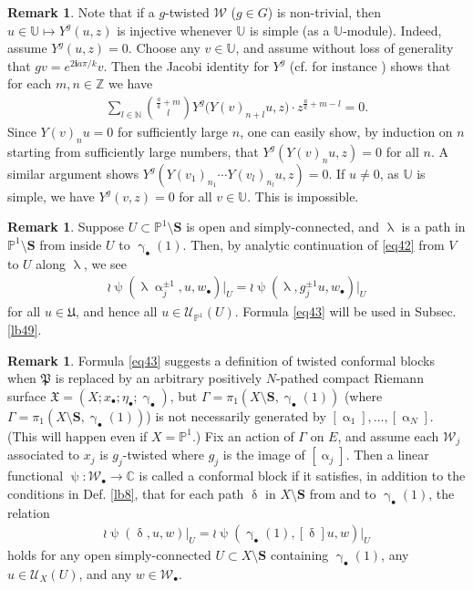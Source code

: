 \documentclass[11pt,b5paper,notitlepage]{article}
\theoremstyle{definition}
\newtheorem{rem}[df]{Remark}
\theoremstyle{plain}
\newcommand{\fk}{\mathfrak}
\newcommand{\mc}{\mathcal}
\newcommand{\scr}{\mathscr}
\newcommand{\im}{\mathbf{i}}
\newcommand{\blt}{\bullet}
\newcommand{\Ubb}{\mathbb U}
\newcommand{\Cbb}{\mathbb C}
\newcommand{\Nbb}{\mathbb N}
\newcommand{\Zbb}{\mathbb Z}
\newcommand{\Pbb}{\mathbb P}
\newcommand{\Sbf}{\mathbf{S}}
\numberwithin{equation}{subsection}
\begin{document}
\begin{rem}
	Note that if a $g$-twisted $\mc W$ ($g\in G$) is non-trivial, then $u\in\Ubb\mapsto Y^g(u,z)$ is injective whenever $\Ubb$ is simple (as a $\Ubb$-module). Indeed, assume $Y^g(u,z)=0$. Choose any $v\in \Ubb$, and assume without loss of generality that $gv=e^{2\im a\pi/k}v$. Then the Jacobi identity for $Y^g$ (cf. for instance \cite[Sec. 10]{Gui24b}) shows that for each $m,n\in\Zbb$ we have
	\begin{align*}
		\sum_{l\in\Nbb}{\frac ak+m\choose l} Y^g\big(Y(v)_{n+l}u,z\big)\cdot z^{\frac ak+m-l}=0.
	\end{align*}
	Since $Y(v)_nu=0$ for sufficiently large $n$, one can easily show, by induction on $n$ starting from sufficiently large numbers, that $Y^g(Y(v)_nu,z)=0$ for all $n$. A similar argument shows $Y^g(Y(v_1)_{n_1}\cdots Y(v_l)_{n_l}u,z)=0$. If $u\neq 0$, as $\Ubb$ is simple, we have $Y^g(v,z)=0$ for all $v\in\Ubb$. This is impossible.
\end{rem}


\begin{rem}
	Suppose $U\subset\Pbb^1\setminus\Sbf$ is open and simply-connected, and $\uplambda$ is a path in $\Pbb^1\setminus\Sbf$ from inside $U$ to $\upgamma_\blt(1)$. Then, by analytic continuation of \eqref{eq42} from $V$ to $U$ along $\uplambda$, we see
	\begin{align}
		\wr\uppsi(\uplambda\upalpha_j^{\pm1},u,w_\blt)\big|_U=	\wr\uppsi(\uplambda,g_j^{\pm1}u,w_\blt)\big|_U\label{eq43}
	\end{align}
	for all $u\in\fk U$, and hence all $u\in\scr U_{\Pbb^1}(U)$. Formula \eqref{eq43} will be used in Subsec. \ref{lb49}.
\end{rem}


\begin{rem}\label{lb64}
Formula \eqref{eq43} suggests a definition of twisted conformal blocks when $\fk P$ is replaced by an arbitrary positively $N$-pathed compact Riemann surface $\fk X=(X;x_\blt;\eta_\blt;\upgamma_\blt)$, but  $\Gamma=\pi_1(X\setminus\Sbf,\upgamma_\blt(1))$ (where $\Gamma=\pi_1(X\setminus\Sbf,\upgamma_\blt(1))$) is not necessarily generated by $[\upalpha_1],\dots,[\upalpha_N]$. (This will happen even if $X=\Pbb^1$.) Fix an action of $\Gamma$ on $E$, and assume each $\mc W_j$ associated to $x_j$ is $g_j$-twisted where $g_j$ is the image of $[\upalpha_j]$. Then a  linear functional $\uppsi:\mc W_\blt\rightarrow\Cbb$ is called a  conformal block  if it satisfies, in addition to the conditions in Def. \ref{lb8}, that for each path $\updelta$ in $X\setminus\Sbf$ from and to $\upgamma_\blt(1)$, the relation
\begin{align}
\wr\uppsi(\updelta,u,w)\big|_U=	\wr\uppsi(\upgamma_\blt(1),[\updelta]u,w)\big|_U	
\end{align}
holds for any open simply-connected $U\subset X\setminus\Sbf$ containing $\upgamma_\blt(1)$, any $u\in\scr U_X(U)$, and any $w\in\mc W_\blt$.
\end{rem}
\end{document}
